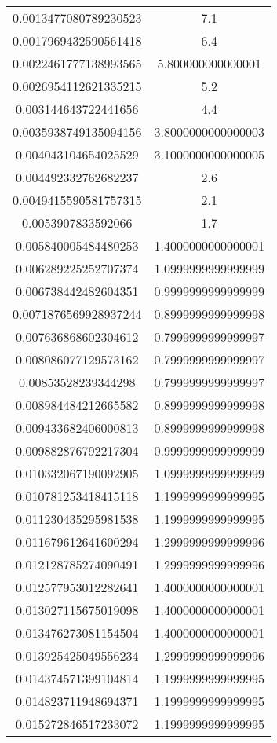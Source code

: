 \begin{table}
\begin{tabular}{S[]S[]}
0.0013477080789230523 & 7.1\\
0.0017969432590561418 & 6.4\\
0.0022461777138993565 & 5.800000000000001\\
0.0026954112621335215 & 5.2\\
0.003144643722441656 & 4.4\\
0.0035938749135094156 & 3.8000000000000003\\
0.004043104654025529 & 3.1000000000000005\\
0.004492332762682237 & 2.6\\
0.0049415590581757315 & 2.1\\
0.0053907833592066 & 1.7\\
0.005840005484480253 & 1.4000000000000001\\
0.006289225252707374 & 1.0999999999999999\\
0.006738442482604351 & 0.9999999999999999\\
0.0071876569928937244 & 0.8999999999999998\\
0.007636868602304612 & 0.7999999999999997\\
0.008086077129573162 & 0.7999999999999997\\
0.00853528239344298 & 0.7999999999999997\\
0.008984484212665582 & 0.8999999999999998\\
0.009433682406000813 & 0.8999999999999998\\
0.009882876792217304 & 0.9999999999999999\\
0.010332067190092905 & 1.0999999999999999\\
0.010781253418415118 & 1.1999999999999995\\
0.011230435295981538 & 1.1999999999999995\\
0.011679612641600294 & 1.2999999999999996\\
0.012128785274090491 & 1.2999999999999996\\
0.012577953012282641 & 1.4000000000000001\\
0.013027115675019098 & 1.4000000000000001\\
0.013476273081154504 & 1.4000000000000001\\
0.013925425049556234 & 1.2999999999999996\\
0.014374571399104814 & 1.1999999999999995\\
0.014823711948694371 & 1.1999999999999995\\
0.015272846517233072 & 1.1999999999999995\\
\bottomrule
\end{tabular}\end{table}